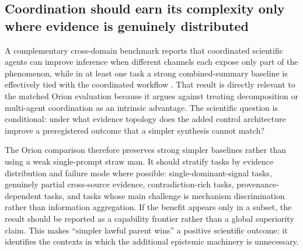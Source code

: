 \subsection{Coordination should earn its complexity only where evidence is genuinely distributed}

A complementary cross-domain benchmark reports that coordinated scientific agents can improve inference when different channels each expose only part of the phenomenon, while in at least one task a strong combined-summary baseline is effectively tied with the coordinated workflow \cite{wong2026coordination}. That result is directly relevant to the matched Orion evaluation because it argues against treating decomposition or multi-agent coordination as an intrinsic advantage. The scientific question is conditional: under what evidence topology does the added control architecture improve a preregistered outcome that a simpler synthesis cannot match?

The Orion comparison therefore preserves strong simpler baselines rather than using a weak single-prompt straw man. It should stratify tasks by evidence distribution and failure mode where possible: single-dominant-signal tasks, genuinely partial cross-source evidence, contradiction-rich tasks, provenance-dependent tasks, and tasks whose main challenge is mechanism discrimination rather than information aggregation. If the benefit appears only in a subset, the result should be reported as a capability frontier rather than a global superiority claim. This makes ``simpler lawful parent wins'' a positive scientific outcome: it identifies the contexts in which the additional epistemic machinery is unnecessary.
